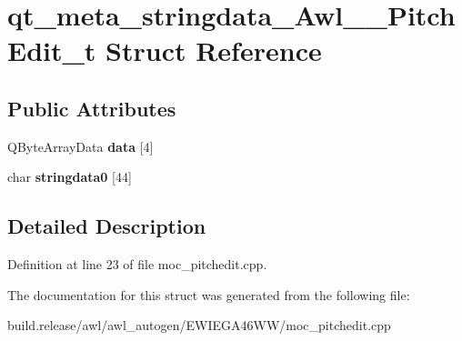 \hypertarget{structqt__meta__stringdata___awl_____pitch_edit__t}{}\section{qt\+\_\+meta\+\_\+stringdata\+\_\+\+Awl\+\_\+\+\_\+\+Pitch\+Edit\+\_\+t Struct Reference}
\label{structqt__meta__stringdata___awl_____pitch_edit__t}
\subsection*{Public Attributes}
\begin{DoxyCompactItemize}
\item 
\mbox{\label{structqt__meta__stringdata___awl_____pitch_edit__t_a4e9acc1f28dc4deea0952d50f26bf6d1}} 
Q\+Byte\+Array\+Data {\bfseries data} \mbox{[}4\mbox{]}
\item 
\mbox{\label{structqt__meta__stringdata___awl_____pitch_edit__t_ad7081d9c11b45228ad0326da3c737e92}} 
char {\bfseries stringdata0} \mbox{[}44\mbox{]}
\end{DoxyCompactItemize}


\subsection{Detailed Description}


Definition at line 23 of file moc\+\_\+pitchedit.\+cpp.



The documentation for this struct was generated from the following file\+:\begin{DoxyCompactItemize}
\item 
build.\+release/awl/awl\+\_\+autogen/\+E\+W\+I\+E\+G\+A46\+W\+W/moc\+\_\+pitchedit.\+cpp\end{DoxyCompactItemize}
